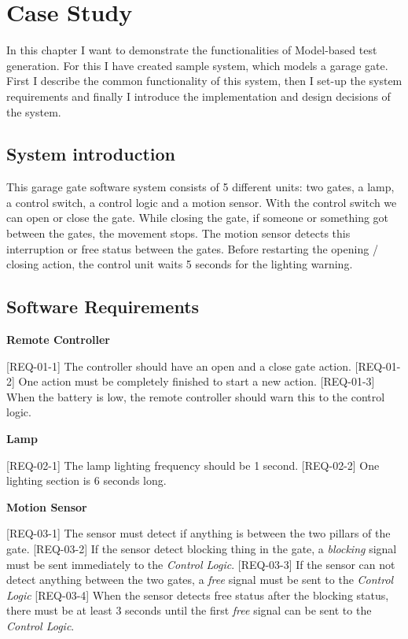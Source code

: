 \chapter{Case Study}\label{sect:case-study}
In this chapter I want to demonstrate the functionalities of Model-based test generation. For this I have created sample system, which models a garage gate. First I describe the common functionality of this system, then I set-up the system requirements and finally I introduce the implementation and design decisions of the system.

\section{System introduction}
This garage gate software system consists of 5 different units: two gates, a lamp, a control switch, a control logic and a motion sensor. With the control switch we can open or close the gate. While closing the gate, if someone or something got between the gates, the movement stops. The motion sensor detects this interruption or free status between the gates. Before restarting the opening / closing action, the control unit waits 5 seconds for the lighting warning. 

\section{Software Requirements}
\textbf{Remote Controller}

[REQ-01-1] The controller should have an open and a close gate action.
[REQ-01-2] One action must be completely finished to start a new action. 
[REQ-01-3] When the battery is low, the remote controller should warn this to the control logic.

\textbf{Lamp} 

[REQ-02-1] The lamp lighting frequency should be 1 second.
[REQ-02-2] One lighting section is 6 seconds long.

\textbf{Motion Sensor}

[REQ-03-1] The sensor must detect if anything is between the two pillars of the gate. 
[REQ-03-2] If the sensor detect blocking thing in the gate, a \textit{blocking} signal must be sent immediately to the \textit{Control Logic}.
[REQ-03-3] If the sensor can not detect anything between the two gates, a \textit{free} signal must be sent to the \textit{Control Logic}
[REQ-03-4] When the sensor detects free status after the blocking status, there must be at least 3 seconds until the first \textit{free} signal can be sent to the \textit{Control Logic}.

